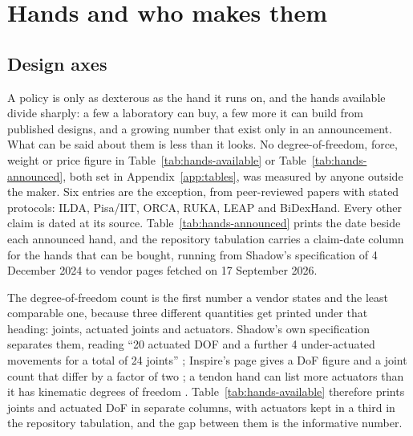 \section{Hands and who makes them}
\label{sec:hands}

\subsection{Design axes}
\label{sec:hands:axes}


A policy is only as dexterous as the hand it runs on, and the hands available divide sharply: a
few a laboratory can buy, a few more it can build from published designs, and a growing number
that exist only in an announcement. What can be said about them is less than it looks. No
degree-of-freedom, force, weight or price figure in Table~\ref{tab:hands-available} or
Table~\ref{tab:hands-announced}, both set in Appendix~\ref{app:tables}, was measured by anyone
outside the maker. Six entries are the exception, from peer-reviewed papers with stated protocols:
ILDA, Pisa/IIT, ORCA, RUKA, LEAP and BiDexHand. Every other claim is dated at its source.
Table~\ref{tab:hands-announced} prints the date beside each announced hand, and the repository
tabulation carries a claim-date column for the hands that can be bought, running from Shadow's
specification of 4 December 2024 to vendor pages fetched on 17 September 2026.

The degree-of-freedom count is the first number a vendor states and the least comparable one,
because three different quantities get printed under that heading: joints, actuated joints and
actuators. Shadow's own specification separates them, reading ``20 actuated DOF and a further 4
under-actuated movements for a total of 24 joints'' \cite{shadow_dexterous_hand_2005}; Inspire's
page gives a DoF figure and a joint count that differ by a factor of two
\cite{inspire_rh56dfx_2023}; a tendon hand can list more actuators than it has kinematic degrees
of freedom \cite{daxo_muscle_v0_2025}. Table~\ref{tab:hands-available} therefore prints joints and
actuated DoF in separate columns, with actuators kept in a third in the repository tabulation, and
the gap between them is the informative number.

